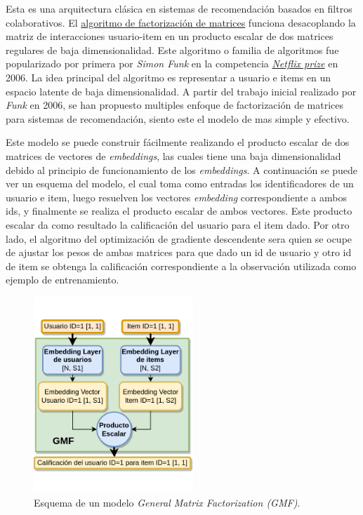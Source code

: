 \documentclass[11pt,a4paper,twoside]{thesis}
\begin{document}
Esta es una arquitectura clásica en sistemas de recomendación basados en filtros colaborativos. El \href{https://sifter.org/~simon/journal/20061211.html}{algoritmo de factorización de matrices} funciona desacoplando la matriz de interacciones usuario-item en un producto escalar de dos matrices regulares de baja dimensionalidad. Este algoritmo o familia de algoritmos fue popularizado por primera por \textit{Simon Funk} en la competencia \href{https://en.wikipedia.org/wiki/Netflix_Prize}{\textit{Netflix prize}} en 2006. La idea principal del algoritmo es representar a usuario e items en un espacio latente de baja dimensionalidad.
A partir del trabajo inicial realizado por  \textit{Funk} en 2006, se han propuesto multiples enfoque de factorización de matrices para sistemas de recomendación, siento este el modelo de mas simple y efectivo.

Este modelo se puede construir fácilmente realizando el producto escalar de dos matrices de vectores de \textit{embeddings}, las cuales tiene una baja dimensionalidad debido al principio de funcionamiento de los \textit{embeddings}. A continuación se puede ver un esquema del modelo, el cual toma como entradas los identificadores de un usuario e item, luego resuelven los vectores \textit{embedding} correspondiente a ambos ids, y finalmente se realiza el producto escalar de ambos vectores. Este producto escalar da como resultado la calificación del usuario para el item dado. Por otro lado, el algoritmo del optimización de gradiente descendente sera quien se ocupe de ajustar los pesos de ambas matrices para que dado un id de usuario y otro id de item se obtenga la calificación correspondiente a la observación utilizada como ejemplo de entrenamiento.

\begin{figure}[h!]
	\centering
	\includegraphics[width=6cm]{./images/GMF.png}
	\caption{
		Esquema de un modelo \textit{General Matrix Factorization (GMF)}.
	}
	\label{fig:GMFModel}
\end{figure}
\end{document}
